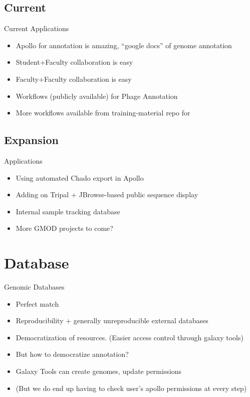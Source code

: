 \documentclass[12pt]{phage3slides} %
\begin{document}
\subsection{Current}
\begin{frame}{Current Applications}
    \begin{itemize}
        \item Apollo for annotation is amazing, ``google docs'' of genome annotation
        \item Student+Faculty collaboration is easy
        \item Faculty+Faculty collaboration is easy

        \item Workflows (publicly available) for Phage Annotation
        \item More workflows available from training-material repo for 
    \end{itemize}
\end{frame}

\subsection{Expansion}
\begin{frame}{Applications}
    \begin{itemize}
        \item Using automated Chado export in Apollo
        \item Adding on Tripal + JBrowse-based public sequence display
        \item Internal sample tracking database
        \item More GMOD projects to come?
    \end{itemize}
\end{frame}





\section{Database}

\begin{frame}{Genomic Databases}
    \begin{itemize}
        \item Perfect match
        \item Reproducibility + generally unreproducible external databases
        \item Democratization of resources. (Easier access control through galaxy tools)

        \item But how to democratize annotation?
        \item Galaxy Tools can create genomes, update permissions
        \item (But we do end up having to check user's apollo permissions at every step)
    \end{itemize}
\end{frame}
\end{document}
